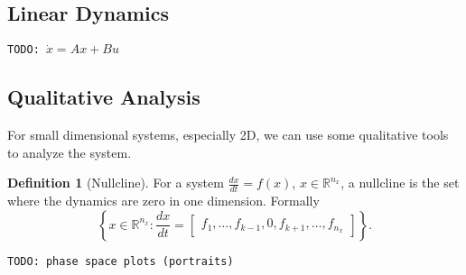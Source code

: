 \documentclass[a4paper]{article}
\newcommand{\todo}[1]{\texttt{TODO: #1}}
\theoremstyle{plain}
\theoremstyle{definition}
\newtheorem{defn}{Definition}[section]
\theoremstyle{remark}
\begin{document}
\subsection{Linear Dynamics}

\todo{$\dot{x} = Ax + Bu$}

\subsection{Qualitative Analysis}

For small dimensional systems, especially 2D, we can use some qualitative
tools to analyze the system.

\begin{defn}[Nullcline]
  For a system $\frac{dx}{dt} = f(x)$, $x \in \mathbb{R}^{n_x}$, a nullcline
  is the set where the dynamics are zero in one dimension. Formally
  \[
    \left\{ x \in \mathbb{R}^{n_x} :
        \frac{dx}{dt} = \begin{bmatrix}
          f_1, \ldots, f_{k-1}, 0, f_{k+1}, \ldots, f_{n_x}
        \end{bmatrix}
    \right\}.
  \]
\end{defn}

\todo{phase space plots (portraits)}
\end{document}
